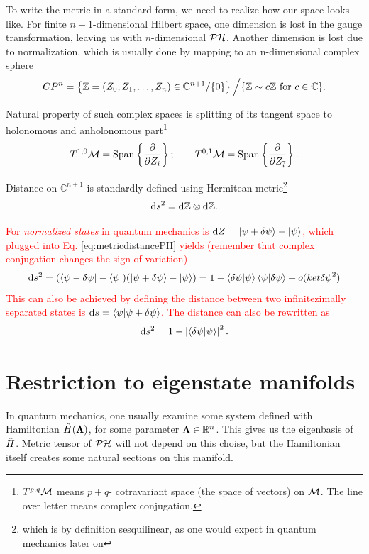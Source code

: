 To write the metric in a standard form, we need to realize how our space looks like. For finite $n+1$-dimensional Hilbert space, one dimension is lost in the gauge transformation, leaving us with $n$-dimensional $\mathcal{PH}$. Another dimension is lost due to normalization, which is usually done by mapping to an n-dimensional complex sphere
$$CP^n= \left\{ \mathbb{Z}=(Z_0,Z_1,\dots,Z_n)\in \mathbb{C}^{n+1}/\{0\} \right\}\Big/ \{\mathbb{Z}\sim c\mathbb{Z} \text{ for } c\in \mathbb{C}\}.$$

Natural property of such complex spaces is splitting of its tangent space to holonomous and anholonomous part\footnote{$T^{p,q}\mathcal{M}$ means $p+q$- cotravariant space (the space of vectors) on $\mathcal{M}$. The line over letter means complex conjugation.}
$$T^{1,0}\mathcal{M}=\text{Span}\left\{\frac{\partial}{\partial Z_i}\right\}; \qquad T^{0,1}\mathcal{M}=\text{Span}\left\{\frac{\partial}{\partial Z_{\overline{i}}}\right\}.$$


Distance on $\mathbb{C}^{n+1}$ is standardly defined using Hermitean metric\footnote{which is by definition sesquilinear, as one would expect in quantum mechanics later on} 
\begin{equation}
    \mathrm{d} s^2 = \mathrm{d} \overline{\mathbb{Z}} \otimes \mathrm{d} \mathbb{Z}.
\label{eq:metricdistancePH}
\end{equation}

\textcolor{red}{
For \emph{normalized states} in quantum mechanics is $\mathrm{d} Z=\ket{\psi+\delta \psi}-\ket{\psi}$, which plugged into Eq. \ref{eq:metricdistancePH} yields (remember that complex conjugation changes the sign of variation)
\begin{equation}
    \mathrm{d} s^2 = (\bra{\psi-\delta \psi}-\bra{\psi})(\ket{\psi+\delta \psi}-\ket{\psi})=1-\braket{\delta \psi|\psi}\braket{\psi|\delta \psi}+o(ket{\delta \psi}^2)
\end{equation}
This can also be achieved by defining the distance between two infinitezimally separated states is $\mathrm{d} s=\braket{\psi|\psi+\delta \psi}$. The distance can also be rewritten as
\begin{equation}
    \mathrm{d} s^2 = 1-\left|\braket{\delta \psi|\psi}\right|^2.
    \label{eq:distanceInPH}
\end{equation}
}

\section{Restriction to eigenstate manifolds}
In quantum mechanics, one usually examine some system defined with Hamiltonian $\hat{H}({\bm\Lambda})$, for some parameter ${\bm\Lambda}\in \mathbb{R}^n$. This gives us the eigenbasis of $\hat{H}$. Metric tensor of $\mathcal{PH}$ will not depend on this choise, but the Hamiltonian itself creates some natural sections on this manifold. 

